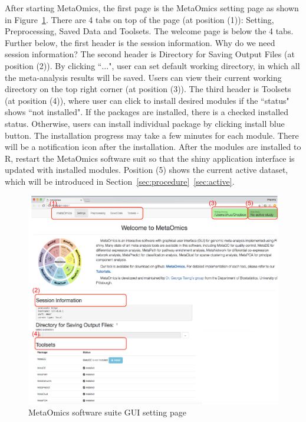
After starting MetaOmics, 
the first page is the MetaOmics setting page as shown in Figure~\ref{fig:GUIsetting}.  
There are 4 tabs on top of the page (at position {\color{red} (1)}): Setting, Preprocessing, Saved Data and Toolsets.
The welcome page is below the 4 tabs.
Further below, the first header is the session information.
{
\color{blue}
Why do we need session information?
}
The second header is Directory for Saving Output Files (at position {\color{red} (2)}).
By clicking ``$\ldots$",
user can set default working directory, in which all the meta-analysis results will be saved.
Users can view their current working directory on the top right corner (at position {\color{red} (3)}).
The third header is Toolsets (at position {\color{red} (4)}),
where user can click to install desired modules if the ``status" shows ``not installed".
If the packages are installed, there is a checked installed status.
Otherwise, users can install individual package by clicking install blue button.
The installation progress may take a few minutes for each module.
There will be a notification icon after the installation. 
After the modules are installed to R, restart the MetaOmics software suit so that the shiny application interface is updated with installed modules.
Position {\color{red} (5)} shows the current active dataset, which will be introduced in Section~\ref{sec:procedure}~\ref{sec:active}. 
 
\begin{figure}[H]
\begin{center}
\includegraphics[scale=0.8]{./figure/preprocessing/GUIsetting}
\caption{MetaOmics software suite GUI setting page}
\label{fig:GUIsetting}
\end{center}
\end{figure}

